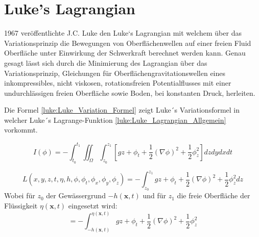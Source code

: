 %
%
%
%
\section{Luke's Lagrangian\label{luke:section:Luke_Lagrangian}}

1967 veröffentlichte J.C. Luke \cite{luke:Luke1967} den Luke`s Lagrangian mit welchem über das Variationsprinzip die Bewegungen von Oberflächenwellen auf einer freien Fluid Oberfläche unter Einwirkung der Schwerkraft berechnet werden kann.
Genau gesagt lässt sich durch die Minimierung des Lagrangian über das Variationsprinzip, Gleichungen für Oberflächengravitationswellen eines inkompressibles, nicht viskosen, rotationsfreien Potentialflusses mit einer undurchlässigen freien Oberfläche sowie Boden, bei konstanten Druck, herleiten.

Die Formel \eqref{luke:Luke_Variation_Formel} zeigt Luke´s Variationsformel in welcher Luke´s Lagrange-Funktion \eqref{luke:Luke_Lagrangian_Allgemein} vorkommt.

\begin{equation}
	I(\phi)
	=
	- \int_{t_0}^{t_1} \iint_{\Omega}^{} \int_{z_0}^{z_1}\left[
	g z + \phi_t + \frac{1}{2}(\nabla\phi)^2 + \frac{1}{2}\phi_z^2
	\right] dzdydxdt
	\label{luke:Luke_Variation_Formel}
\end{equation}

\begin{equation}
	L(x,y,z,t,\eta,h,\phi,\phi_t,\phi_x, \phi_y, \phi_z)
	=
	-\int_{z_0}^{z_1} g z + \phi_t + \frac{1}{2}(\nabla\phi)^2 + \frac{1}{2}\phi_z^2 dz
		\label{luke:Luke_Lagrangian_Allgemein}
\end{equation}
Wobei für $z_0$ der Gewässergrund $-h(\bm{x},t)$ und für $z_1$ die freie Oberfläche der Flüssigkeit $\eta(\bm{x},t)$ eingesetzt wird:
\[
=
-\int_{-h(\bm{x},t)}^{\eta(\bm{x},t)} 
g z + \phi_t + \frac{1}{2}(\nabla\phi)^2 + \frac{1}{2}\phi_z^2
\]

